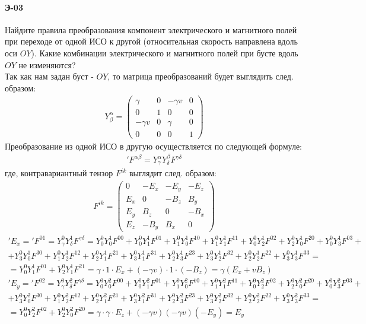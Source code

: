 



\paragraph{Э-03}
Найдите правила преобразования компонент электрического и магнитного полей при переходе от одной ИСО к другой (относительная скорость направлена вдоль оси $OY$). Какие комбинации электрического и магнитного полей при бусте вдоль $OY$ не изменяются?\\

Так как нам задан буст - $OY$, то матрица преобразований будет выглядить след. образом:
\begin{gather*}
	Y^\alpha_\beta = \begin{pmatrix}
	\gamma & 0 & -\gamma v & 0 \\
	0 & 1 & 0 & 0 \\         
	-\gamma v & 0 & \gamma & 0 \\
	0 & 0 & 0 & 1
	\end{pmatrix}
\end{gather*}
Преобразование из одной ИСО в другую осуществляется по следующей формуле:
\begin{gather*}
'F^{\alpha \beta} = Y^\alpha_\gamma Y^\beta_\delta F^{\gamma \delta}
\end{gather*}
где, контравариантный тензор $F^{ik}$ выглядит след. образом: 
\begin{gather*}
F^{ik} = \begin{pmatrix}
0 & -E_x & -E_y & -E_z \\
E_x & 0 & -B_z & B_y \\         
E_y & B_z & 0 & -B_x \\
E_z & -B_y & B_x & 0
\end{pmatrix}
\end{gather*}
\begin{gather*}
'E_x ='F^{01} = Y^0_\gamma Y^1_\delta F^{\gamma \delta} = Y^0_0 Y^1_0 F^{00}+Y^0_0 Y^1_1 F^{01}+Y^0_1 Y^1_0 F^{10}+Y^0_1 Y^1_1 F^{11}+Y^0_0 Y^1_2 F^{02}+Y^0_2 Y^1_0 F^{20}+Y^0_0 Y^1_3 F^{03}+\\+Y^0_3 Y^1_0 F^{30}+Y^0_1 Y^1_2 F^{12}+Y^0_2 Y^1_1 F^{21}+Y^0_3 Y^1_1 F^{31}+Y^0_2 Y^1_3 F^{23}+Y^0_3 Y^1_2 F^{32}+Y^0_2 Y^1_2 F^{22}+Y^0_3 Y^1_3 F^{33}=\\
=Y^0_0 Y^1_1 F^{01}+Y^0_2 Y^1_1 F^{21}=\gamma \cdot 1 \cdot E_x+(-\gamma v)\cdot 1 \cdot (-B_z) = \gamma (E_x+vB_z)
\end{gather*}
\begin{gather*}
'E_y ='F^{02} = Y^0_\gamma Y^2_\delta F^{\gamma \delta} = Y^0_0 Y^2_0 F^{00}+Y^0_0 Y^2_1 F^{01}+Y^0_1 Y^2_0 F^{10}+Y^0_1 Y^2_1 F^{11}+Y^0_0 Y^2_2 F^{02}+Y^0_2 Y^2_0 F^{20}+Y^0_0 Y^2_3 F^{03}+\\+Y^0_3 Y^2_0 F^{30}+Y^0_1 Y^2_2 F^{12}+Y^0_2 Y^2_1 F^{21}+Y^0_3 Y^2_1 F^{31}+Y^0_2 Y^2_3 F^{23}+Y^0_3 Y^2_2 F^{32}+Y^0_2 Y^2_2 F^{22}+Y^0_3 Y^2_3 F^{33}=\\
=Y^0_0 Y^2_2 F^{02}+Y^0_2 Y^2_0 F^{20}=\gamma \cdot \gamma \cdot E_z+(-\gamma v)(-\gamma v)(-E_y) = E_y
\end{gather*}
